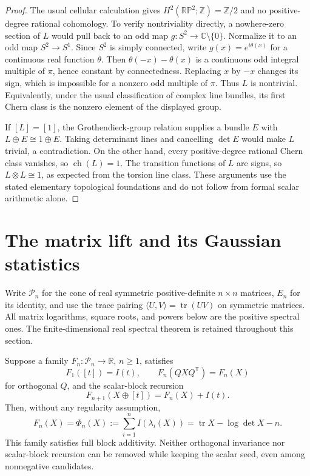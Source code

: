 \begin{proof}
The usual cellular calculation gives
$H^2(\mathbb{RP}^2;\mathbb Z)=\mathbb Z/2$ and no positive-degree
rational cohomology.  To verify nontriviality directly, a nowhere-zero
section of $L$ would pull back to an odd map
$g:S^2\to\mathbb C\setminus\{0\}$.  Normalize it to an odd map
$S^2\to S^1$.  Since $S^2$ is simply connected, write
$g(x)=e^{i\theta(x)}$ for a continuous real function $\theta$.
Then $\theta(-x)-\theta(x)$ is a continuous odd integral multiple
of $\pi$, hence constant by connectedness.  Replacing $x$ by $-x$
changes its sign, which is impossible for a nonzero odd multiple
of $\pi$.  Thus $L$ is nontrivial.  Equivalently, under the usual
classification of complex line bundles, its first Chern class is
the nonzero element of the displayed group.

If $[L]=[1]$, the Grothendieck-group relation supplies a bundle $E$
with $L\oplus E\cong 1\oplus E$.  Taking determinant lines and
cancelling $\det E$ would make $L$ trivial, a contradiction.
On the other hand, every positive-degree rational Chern class
vanishes, so $\operatorname{ch}(L)=1$.  The transition functions of
$L$ are signs, so $L\otimes L\cong1$, as expected from the torsion
line class.  These arguments use the stated elementary topological
foundations and do not follow from formal scalar arithmetic alone.
\end{proof}

\section{The matrix lift and its Gaussian statistics}
\label{final:matrix}

Write $\mathcal P_n$ for the cone of real symmetric positive-definite
$n\times n$ matrices, $E_n$ for its identity, and use the trace pairing
$\langle U,V\rangle=\operatorname{tr}(UV)$ on symmetric matrices.
All matrix logarithms, square roots, and powers below are the positive
spectral ones.  The finite-dimensional real spectral theorem is
retained throughout this section.

\begin{theorem}
\label{final:M1}
Suppose a family $F_n:\mathcal P_n\to\mathbb R$, $n\geq1$, satisfies
\[
 F_1([t])=I(t),\qquad F_n(QXQ^{\mathsf T})=F_n(X)
\]
for orthogonal $Q$, and the scalar-block recursion
\[
 F_{n+1}(X\oplus[t])=F_n(X)+I(t).
\]
Then, without any regularity assumption,
\begin{equation}\label{final:matrix-potential}
 F_n(X)=\Phi_n(X):=\sum_{i=1}^n I(\lambda_i(X))
          =\operatorname{tr}X-\log\det X-n.
\end{equation}
This family satisfies full block additivity.  Neither orthogonal
invariance nor scalar-block recursion can be removed while keeping
the scalar seed, even among nonnegative candidates.
\end{theorem}

